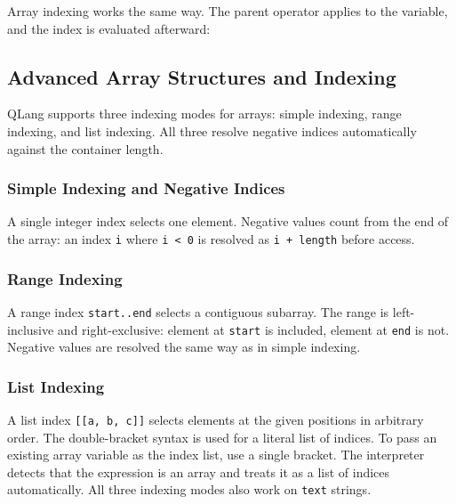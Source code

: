 Array indexing works the same way. The parent operator applies to the variable,
and the index is evaluated afterward:


\subsection{Advanced Array Structures and Indexing}
\label{sec:array-indexing}

QLang supports three indexing modes for arrays: simple indexing, range indexing,
and list indexing. All three resolve negative indices automatically against the
container length.

\subsubsection{Simple Indexing and Negative Indices}
A single integer index selects one element. Negative values count from the end
of the array: an index \texttt{i} where \texttt{i < 0} is resolved as
\texttt{i + length} before access.



\subsubsection{Range Indexing}
A range index \texttt{start..end} selects a contiguous subarray. The range is
left-inclusive and right-exclusive: element at \texttt{start} is included,
element at \texttt{end} is not. Negative values are resolved the same way as
in simple indexing.


\subsubsection{List Indexing}
A list index \texttt{[[a, b, c]]} selects elements at the given positions in
arbitrary order. The double-bracket syntax is used for a literal list
of indices. To pass an existing array variable as the index list, use a
single bracket. The interpreter detects that the expression is an array
and treats it as a list of indices automatically. All three indexing modes
also work on \texttt{text} strings.



